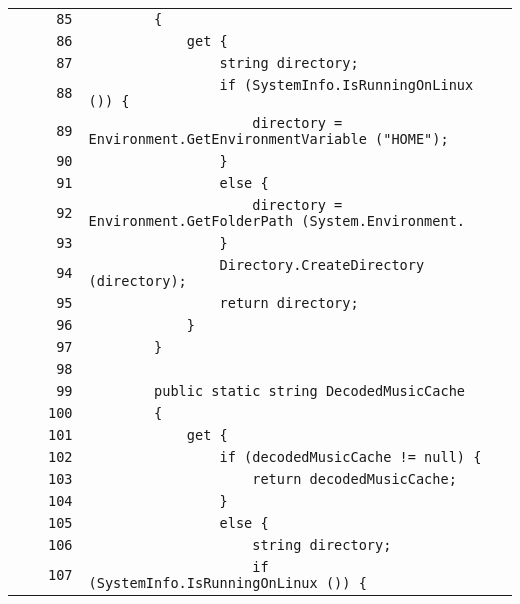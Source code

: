 \documentclass[a4paper,10pt]{article}
\begin{document}
\begin{longtable}[l]{lrrl}
\cellcolor{gray} &  & \verb~85~ & \verb~        {~\\
\cellcolor{gray} &  & \verb~86~ & \verb~            get {~\\
\cellcolor{gray} &  & \verb~87~ & \verb~                string directory;~\\
\cellcolor{gray} &  & \verb~88~ & \verb~                if (SystemInfo.IsRunningOnLinux ()) {~\\
\cellcolor{gray} &  & \verb~89~ & \verb~                    directory = Environment.GetEnvironmentVariable ("HOME");~\\
\cellcolor{gray} &  & \verb~90~ & \verb~                }~\\
\cellcolor{gray} &  & \verb~91~ & \verb~                else {~\\
\cellcolor{gray} &  & \verb~92~ & \verb~                    directory = Environment.GetFolderPath (System.Environment.~\\
\cellcolor{gray} &  & \verb~93~ & \verb~                }~\\
\cellcolor{gray} &  & \verb~94~ & \verb~                Directory.CreateDirectory (directory);~\\
\cellcolor{gray} &  & \verb~95~ & \verb~                return directory;~\\
\cellcolor{gray} &  & \verb~96~ & \verb~            }~\\
\cellcolor{gray} &  & \verb~97~ & \verb~        }~\\
\cellcolor{gray} &  & \verb~98~ & \verb~~\\
\cellcolor{gray} &  & \verb~99~ & \verb~        public static string DecodedMusicCache~\\
\cellcolor{gray} &  & \verb~100~ & \verb~        {~\\
\cellcolor{gray} &  & \verb~101~ & \verb~            get {~\\
\cellcolor{gray} &  & \verb~102~ & \verb~                if (decodedMusicCache != null) {~\\
\cellcolor{gray} &  & \verb~103~ & \verb~                    return decodedMusicCache;~\\
\cellcolor{gray} &  & \verb~104~ & \verb~                }~\\
\cellcolor{gray} &  & \verb~105~ & \verb~                else {~\\
\cellcolor{gray} &  & \verb~106~ & \verb~                    string directory;~\\
\cellcolor{gray} &  & \verb~107~ & \verb~                    if (SystemInfo.IsRunningOnLinux ()) {~\\

\end{longtable}
\end{document}
